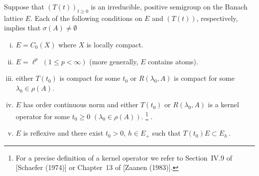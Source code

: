 \begin{theorem}\label{thm:c3-3.7}

Suppose that $(T(t))_{t\geq 0}$ is an irreducible, positive semigroup on the Banach lattice $E$.
Each of the following conditions on $E$ and $(T(t))$, respectively, implies that $\sigma(A) \neq \emptyset$

\begin{enumerate}[(i)]
	\item
	$E = C_{0}(X)$ where $X$ is locally compact.

	\item 
	$E = \ell^{p}$ $(1 \leq p < \infty)$ (more generally, $E$ contains atoms).

	\item either $T(t_{0})$ is compact for some $t_{0}$ or $R(\lambda_{0},A)$ is compact for some $\lambda_{0} \in \rho(A)$.
%
%
	\item 
	$E$ has order continuous norm and either $T(t_{0})$ or $R(\lambda_{0},A)$ is a kernel operator for some $t_{0} \geq 0$ $(\lambda_{0} \in \rho(A))$. 	
	\footnote[1]{For a precise definition of a kernel operator we refer to Section~IV.9 of [Schaefer (1974)] or Chapter~13 of [Zaanen (1983)].}
	.

	\item 
	$E$ is reflexive and there exist $t_{0} > 0$, $h \in E_{+}$ such that $T(t_{0})E \subset E_{h}$\,.
\end{enumerate}
\end{theorem}
